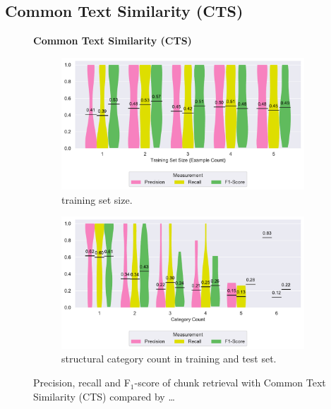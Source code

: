 \subsection{Common Text Similarity (CTS)}
\label{sec:r:cts}
\begin{figure}
\centering
    \textbf{Common Text Similarity (CTS)}\par\medskip
\begin{subfigure}[tb]{\columnwidth}
		\centering
		\includegraphics[width=\columnwidth,
		clip]{img/big-study/recall-precision-examplecount-CTS.pdf}
		\caption{training set size.}
		\label{fig:recall-precision-examplecount-CTS}

\end{subfigure}\hspace{\fill}
\begin{subfigure}[tb]{\columnwidth}
		\centering
				\includegraphics[width=\columnwidth,
				clip]{img/big-study/recall-precision-categorycount-CTS.pdf}
		\caption{structural category count
		in training and test set.}
		\label{fig:recall-precision-categorycount-CTS}
\end{subfigure}
\caption{Precision, recall and F$_{1}$-score of chunk
retrieval with Common Text Similarity (CTS) compared by \ldots}
\end{figure}

